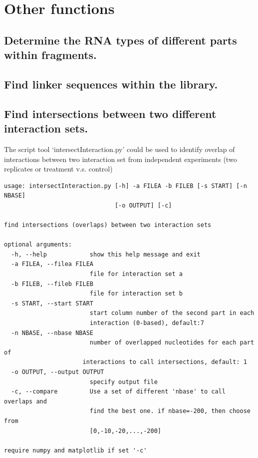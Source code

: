 \documentclass[letterpaper,10pt,english]{sphinxmanual}
\begin{document}
\section{Other functions}
\label{Analysis_pipeline:other-functions}

\subsection{Determine the RNA types of different parts within fragments.}
\label{Analysis_pipeline:rna-types}\label{Analysis_pipeline:determine-the-rna-types-of-different-parts-within-fragments}

\subsection{Find linker sequences within the library.}
\label{Analysis_pipeline:find-linker-sequences-within-the-library}\label{Analysis_pipeline:find-linker}

\subsection{Find intersections between two different interaction sets.}
\label{Analysis_pipeline:find-intersections-between-two-different-interaction-sets}\label{Analysis_pipeline:intersection}
The script tool `intersectInteraction.py' could be used to identify overlap of interactions between two interaction set from independent experiments (two replicates or treatment v.s. control)

\begin{Verbatim}[commandchars=\\\{\}]
usage: intersectInteraction.py [-h] -a FILEA -b FILEB [-s START] [-n NBASE]
                               [-o OUTPUT] [-c]

find intersections (overlaps) between two interaction sets

optional arguments:
  -h, --help            show this help message and exit
  -a FILEA, --filea FILEA
                        file for interaction set a
  -b FILEB, --fileb FILEB
                        file for interaction set b
  -s START, --start START
                        start column number of the second part in each
                        interaction (0-based), default:7
  -n NBASE, --nbase NBASE
                        number of overlapped nucleotides for each part of
                      interactions to call intersections, default: 1
  -o OUTPUT, --output OUTPUT
                        specify output file
  -c, --compare         Use a set of different 'nbase' to call overlaps and
                        find the best one. if nbase=-200, then choose from
                        [0,-10,-20,...,-200]

require numpy and matplotlib if set '-c'
\end{Verbatim}
\end{document}
